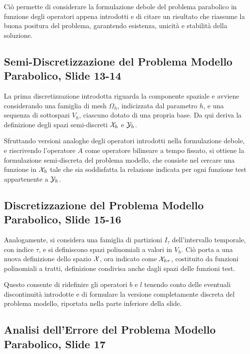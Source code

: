 \documentclass[12pt]{article}
\begin{document}
    Ciò permette di considerare la formulazione debole del problema parabolico in funzione degli operatori appena introdotti e di citare un risultato che riassume la buona positura del problema, garantendo esistenza, unicità e stabilità della soluzione.

    \subsection{Semi-Discretizzazione del Problema Modello Parabolico, Slide 13-14}

    La prima discretizzazione introdotta riguarda la componente spaziale e avviene considerando una famiglia di mesh $\Omega_h$, indicizzata dal parametro $h$, e una sequenza di sottospazi $V_h$, ciascuno dotato di una propria base. Da qui deriva la definizione degli spazi semi-discreti $\mathcal{X}_h$ e $\mathcal{Y}_h$.

    Sfruttando versioni analoghe degli operatori introdotti nella formulazione debole, e riscrivendo l'operatore $A$ come operatore bilineare a tempo fissato, si ottiene la formulazione semi-discreta del problema modello, che consiste nel cercare una funzione in $\mathcal{X}_h$ tale che sia soddisfatta la relazione indicata per ogni funzione test appartenente a $\mathcal{Y}_h$.

    \subsection{Discretizzazione del Problema Modello Parabolico, Slide 15-16}

    Analogamente, si considera una famiglia di partizioni $I_{\tau}$ dell'intervallo temporale, con indice $\tau$, e si definiscono spazi polinomiali a valori in $V_h$. Ciò porta a una nuova definizione dello spazio $\mathcal{X}$, ora indicato come $\mathcal{X}_{h \tau}$, costituito da funzioni polinomiali a tratti, definizione condivisa anche dagli spazi delle funzioni test.

    Questo consente di ridefinire gli operatori $b$ e $l$ tenendo conto delle eventuali discontinuità introdotte e di formulare la versione completamente discreta del problema modello, riportata nella parte inferiore della slide.

    \subsection{Analisi dell'Errore del Problema Modello Parabolico, Slide 17}
\end{document}
